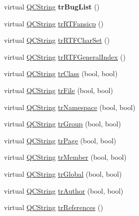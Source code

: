 \begin{DoxyCompactItemize}
\item 
\hypertarget{class_translator_chinese_a6922767c9b6ff214503967c6f8b66468}{virtual \hyperlink{class_q_c_string}{Q\-C\-String} {\bfseries tr\-Bug\-List} ()}\label{class_translator_chinese_a6922767c9b6ff214503967c6f8b66468}

\item 
virtual \hyperlink{class_q_c_string}{Q\-C\-String} \hyperlink{class_translator_chinese_ac711f1a109c3c8131bf02a9ff6f48e36}{tr\-R\-T\-Fansicp} ()
\item 
virtual \hyperlink{class_q_c_string}{Q\-C\-String} \hyperlink{class_translator_chinese_af3bba50fd4e382b113171e132e88719b}{tr\-R\-T\-F\-Char\-Set} ()
\item 
virtual \hyperlink{class_q_c_string}{Q\-C\-String} \hyperlink{class_translator_chinese_a6a04ffa0f1114981e258cf0a94478c98}{tr\-R\-T\-F\-General\-Index} ()
\item 
virtual \hyperlink{class_q_c_string}{Q\-C\-String} \hyperlink{class_translator_chinese_ad8c64e35c495c244af4789193470ac59}{tr\-Class} (bool, bool)
\item 
virtual \hyperlink{class_q_c_string}{Q\-C\-String} \hyperlink{class_translator_chinese_adf139dd9fe888beb95529f5f7c498dab}{tr\-File} (bool, bool)
\item 
virtual \hyperlink{class_q_c_string}{Q\-C\-String} \hyperlink{class_translator_chinese_a8dd21a354edf39217c1354f284c9f2d5}{tr\-Namespace} (bool, bool)
\item 
virtual \hyperlink{class_q_c_string}{Q\-C\-String} \hyperlink{class_translator_chinese_aeff16d1c6102c748b39e42066d9ed4e6}{tr\-Group} (bool, bool)
\item 
virtual \hyperlink{class_q_c_string}{Q\-C\-String} \hyperlink{class_translator_chinese_ade6d056ddd5658a8211f5a14c86a7893}{tr\-Page} (bool, bool)
\item 
virtual \hyperlink{class_q_c_string}{Q\-C\-String} \hyperlink{class_translator_chinese_a308d3e8064d956e84b92c240d1ff9ff0}{tr\-Member} (bool, bool)
\item 
virtual \hyperlink{class_q_c_string}{Q\-C\-String} \hyperlink{class_translator_chinese_a2e5701433502a83a5274a212db57fcbc}{tr\-Global} (bool, bool)
\item 
virtual \hyperlink{class_q_c_string}{Q\-C\-String} \hyperlink{class_translator_chinese_a4ce6b0c0cffcf6141ba8a989fe5a77d0}{tr\-Author} (bool, bool)
\item 
virtual \hyperlink{class_q_c_string}{Q\-C\-String} \hyperlink{class_translator_chinese_a54eaa9a933568bfd7eaffe36b7872eb0}{tr\-References} ()

\end{DoxyCompactItemize}

